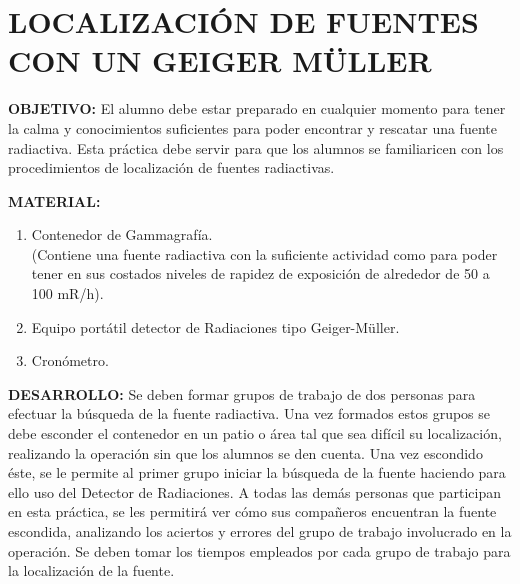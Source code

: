 \section*{LOCALIZACIÓN DE FUENTES CON UN GEIGER MÜLLER}

\textbf{OBJETIVO:} El alumno debe estar preparado en cualquier momento para tener la calma y conocimientos suficientes para poder encontrar y rescatar una fuente radiactiva. Esta práctica debe servir para que los alumnos se familiaricen con los procedimientos de localización de fuentes radiactivas.

\textbf{MATERIAL:}
\begin{enumerate}
    \item Contenedor de Gammagrafía.\\
    (Contiene una fuente radiactiva con la suficiente actividad como para poder tener en sus costados niveles de rapidez de exposición de alrededor de 50 a 100 mR/h).
    \item Equipo portátil detector de Radiaciones tipo Geiger-Müller.
    \item Cronómetro.
\end{enumerate}

\textbf{DESARROLLO:} Se deben formar grupos de trabajo de dos personas para efectuar la búsqueda de la fuente radiactiva. Una vez formados estos grupos se debe esconder el contenedor en un patio o área tal que sea difícil su localización, realizando la operación sin que los alumnos se den cuenta. Una vez escondido éste, se le permite al primer grupo iniciar la búsqueda de la fuente haciendo para ello uso del Detector de Radiaciones. A todas las demás personas que participan en esta práctica, se les permitirá ver cómo sus compañeros encuentran la fuente escondida, analizando los aciertos y errores del grupo de trabajo involucrado en la operación. Se deben tomar los tiempos empleados por cada grupo de trabajo para la localización de la fuente.